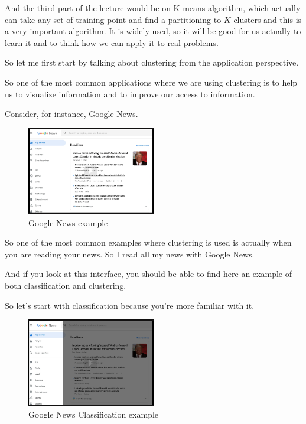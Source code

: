 \documentclass[a4paper, 12pt]{article}
\begin{document}
And the third part of the lecture would be on K-means algorithm, which actually
can take any set of training point and find a partitioning to \(K\) clusters and
this is a very important algorithm. It is widely used, so it will be good for us
actually to learn it and to think how we can apply it to real problems.

So let me first start by talking about clustering from the application
perspective.

So one of the most common applications where we are using clustering is to help
us to visualize information and to improve our access to information.

Consider, for instance, Google News.

\begin{figure}[H]
\centering
\includegraphics[width=0.5\textwidth]{./pic/intro-to-clustering-example-google-news.png}
\caption{\label{fig:orgc49eaaa}Google News example}
\end{figure}

So one of the most common examples where clustering is used is actually when you
are reading your news. So I read all my news with Google News.

And if you look at this interface, you should be able to find here an example of
both classification and clustering.

So let's start with classification because you're more familiar with it.

\begin{figure}[H]
\centering
\includegraphics[width=0.5\textwidth]{./pic/google-news-classification.png}
\caption{\label{fig:org477c871}Google News Classification example}
\end{figure}
\end{document}
